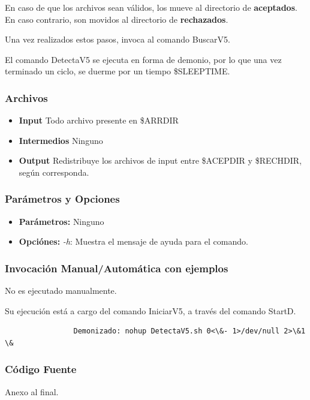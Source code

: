 \documentclass[a4paper,10pt,titlepage]{article}
\begin{document}
	En caso de que los archivos sean v\'alidos, los mueve al directorio de \textbf{aceptados}. En caso contrario, son movidos al directorio de \textbf{rechazados}. 

		Una vez realizados estos pasos, invoca al comando BuscarV5.

		El comando DetectaV5 se ejecuta en forma de demonio, por lo que una vez terminado un ciclo, se duerme por un tiempo \$SLEEPTIME.			 

		\subsubsection{Archivos}
			\begin {itemize}
				\item \textbf{Input} {Todo archivo presente en \$ARRDIR }
				\item \textbf{Intermedios} {Ninguno}
				\item \textbf{Output} {Redistribuye los archivos de input entre \$ACEPDIR y \$RECHDIR, seg\'un corresponda.}
			\end{itemize}

		\subsubsection{Par\'ametros y Opciones}
			\begin {itemize}
				\item \textbf{Par\'ametros: }{Ninguno}
				\item \textbf{Opci\'ones: } {\textit{-h}: Muestra el mensaje de ayuda para el comando.}
			\end{itemize}
	
		\subsubsection{Invocaci\'on Manual/Autom\'atica con ejemplos}
			No es ejecutado manualmente. 

			Su ejecuci\'on est\'a a cargo del comando IniciarV5, a trav\'es del comando StartD.
			\begin{verbatim}
				Demonizado: nohup DetectaV5.sh 0<\&- 1>/dev/null 2>\&1 \&
			\end{verbatim}


		\subsubsection{C\'odigo Fuente}
			Anexo al final.
\end{document}
